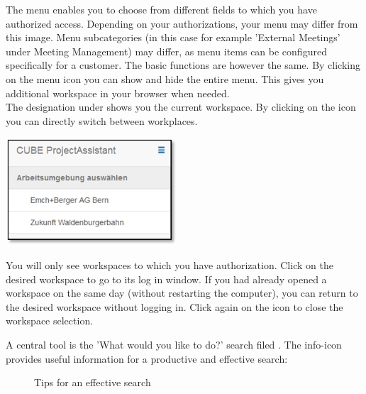The menu enables you to choose from different fields to which you have authorized access. Depending on your authorizations, your menu may differ from this image. Menu subcategories (in this case for example 'External Meetings' under Meeting Management) may differ, as menu items can be configured specifically for a customer. The basic functions are however the same. By clicking on the menu icon  you can show and hide the entire menu. This gives you additional workspace in your browser when needed. \\
The designation under  shows you the current workspace. By clicking on the icon  you can directly switch between workplaces.

\vspace{\baselineskip}

\begin{raggedleft}
\hspace{80mm} \includegraphics[height=40mm]{../chapters/02_GettingStarted/pictures/2-5-1_Arbeitsumgebung_wechseln.jpg}
\end{raggedleft}

\vspace{\baselineskip}

You will only see workspaces to which you have authorization. Click on the desired workspace to go to its log in window. If you had already opened a workspace on the same day (without restarting the computer), you can return to the desired workspace without logging in. Click again on the icon  to close the workspace selection. 

\vspace{\baselineskip}

A central tool is the 'What would you like to do?' search filed . The info-icon  provides useful information for a productive and effective search:

\begin{figure}[H]
\caption{Tips for an effective search}
\end{figure}


